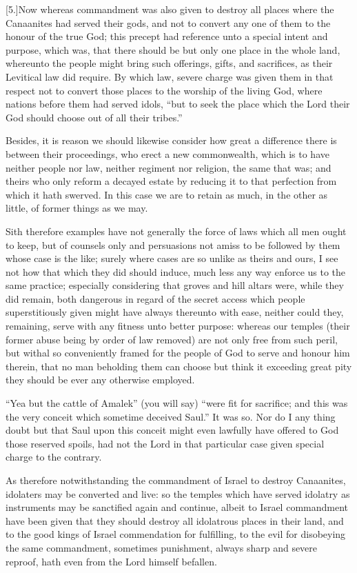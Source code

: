 [5.]Now whereas commandment was also given to destroy all places where the Canaanites had served their gods, and not to convert any one of them to the honour of the true God; this precept had reference unto a special intent and purpose, which was, that there should be but only one place in the whole land, whereunto the people might bring such offerings, gifts, and sacrifices, as their Levitical law did require. By which law, severe charge was given them in that respect not to convert those places to the worship of the living God, where nations before them had served idols, “but to seek the place which the Lord their God should choose out of all their tribes.”

Besides, it is reason we should likewise consider how great a difference there is between their proceedings, who erect a new commonwealth, which is to have neither people nor law, neither regiment nor religion, the same that was; and theirs who only reform a decayed estate by reducing it to that perfection from which it hath swerved. In this case we are to retain as much, in the other as little, of former things as we may.

Sith therefore examples have not generally the force of laws which all men ought to keep, but of counsels only and persuasions not amiss to be followed by them whose case is the like; surely where cases are so unlike as theirs and ours, I see not how that which they did should induce, much less any way enforce us to the same practice; especially considering that groves and hill altars were, while they did remain, both dangerous in regard of the secret access which people superstitiously given might have always thereunto with ease, neither could they, remaining, serve with any fitness unto better purpose: whereas our temples (their former abuse being by order of law removed) are not only free from such peril, but withal so conveniently framed for the people of God to serve and honour him therein, that no man beholding them can choose but think it exceeding great pity they should be ever any otherwise employed.

“Yea but the cattle of Amalek” (you will say) “were fit  for sacrifice; and this was the very conceit which sometime deceived Saul.”
 It was so. Nor do I any thing doubt but that Saul upon this conceit might even lawfully have offered to God those reserved spoils, had not the Lord in that particular case given special charge to the contrary.

As therefore notwithstanding the commandment of Israel to destroy Canaanites, idolaters may be converted and live: so the temples which have served idolatry as instruments may be sanctified again and continue, albeit to Israel commandment have been given that they should destroy all idolatrous places in their land, and to the good kings of Israel commendation for fulfilling, to the evil for disobeying the same commandment, sometimes punishment, always sharp and severe reproof, hath even from the Lord himself befallen.

